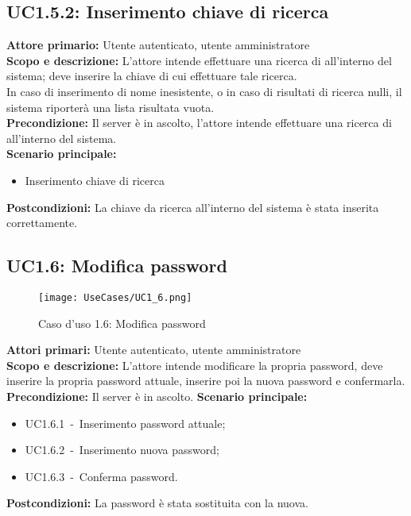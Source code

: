 \documentclass{scalatekids-article}
\begin{document}
\subsection{UC1.5.2: Inserimento chiave di ricerca}

\textbf{Attore primario:} Utente autenticato, utente amministratore\\
\textbf{Scopo e descrizione:} L'attore intende effettuare una ricerca di  all'interno del sistema; deve inserire la chiave di cui effettuare tale ricerca.\\
In caso di inserimento di nome  inesistente, o in caso di risultati di ricerca nulli, il sistema riporterà una lista risultata vuota.\\ %
\textbf{Precondizione:} Il server è in ascolto, l'attore intende effettuare una ricerca di  all'interno del  sistema.\\
\textbf{Scenario principale:}
\begin{itemize}
\item Inserimento chiave di ricerca
\end{itemize}
\textbf{Postcondizioni:} La chiave da ricerca all'interno del sistema è stata inserita correttamente.

\subsection{UC1.6: Modifica password}
\begin{figure}[H]
  \begin{center}
    \texttt{[image: UseCases/UC1\_6.png]}
    \caption{Caso d'uso 1.6: Modifica password}
  \end{center}
\end{figure}
\textbf{Attori primari:} Utente autenticato, utente amministratore\\
\textbf{Scopo e descrizione:} L'attore intende modificare la propria password, deve inserire la propria password attuale, inserire poi la nuova password e confermarla.\\
\textbf{Precondizione:} Il server è in ascolto.
\textbf{Scenario principale:}
\begin{itemize}
\item UC1.6.1\ -\ Inserimento password attuale;
\item UC1.6.2\ -\ Inserimento nuova password;
\item UC1.6.3\ -\ Conferma password.
\end{itemize}
\textbf{Postcondizioni:} La password è stata sostituita con la nuova.
\end{document}
